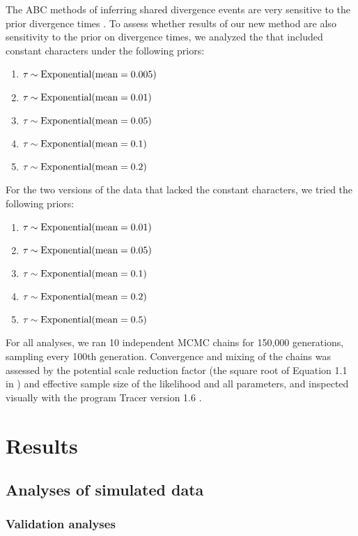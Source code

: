 The ABC methods of inferring shared divergence events are very sensitive to the
prior divergence times
\citep{Oaks2012,Hickerson2013,Oaks2014reply,Oaks2014dpp}.
To assess whether results of our new method are also sensitivity to the
prior on divergence times, we analyzed the \datasets that included constant
characters under the following priors:
\begin{enumerate}
    \item $\tau_{} \sim \textrm{Exponential}(\textrm{mean} = 0.005)$
    \item $\tau_{} \sim \textrm{Exponential}(\textrm{mean} = 0.01)$
    \item $\tau_{} \sim \textrm{Exponential}(\textrm{mean} = 0.05)$
    \item $\tau_{} \sim \textrm{Exponential}(\textrm{mean} = 0.1)$
    \item $\tau_{} \sim \textrm{Exponential}(\textrm{mean} = 0.2)$
\end{enumerate}
For the two versions of the  data that lacked the constant
characters, we tried the following priors:
\begin{enumerate}
    \item $\tau_{} \sim \textrm{Exponential}(\textrm{mean} = 0.01)$
    \item $\tau_{} \sim \textrm{Exponential}(\textrm{mean} = 0.05)$
    \item $\tau_{} \sim \textrm{Exponential}(\textrm{mean} = 0.1)$
    \item $\tau_{} \sim \textrm{Exponential}(\textrm{mean} = 0.2)$
    \item $\tau_{} \sim \textrm{Exponential}(\textrm{mean} = 0.5)$
\end{enumerate}

For all analyses, we ran 10 independent MCMC chains for 150,000 generations,
sampling every 100th generation.
Convergence and mixing of the chains was assessed by the potential scale
reduction factor (the square root of Equation 1.1 in
\citet{Brooks1998}) and effective sample size \citep{Gong2014} of the
likelihood and all parameters, and inspected visually with the program Tracer
version 1.6
\citep{Tracer16}.


\section{Results}

\subsection{Analyses of simulated data}

\subsubsection{Validation analyses}

